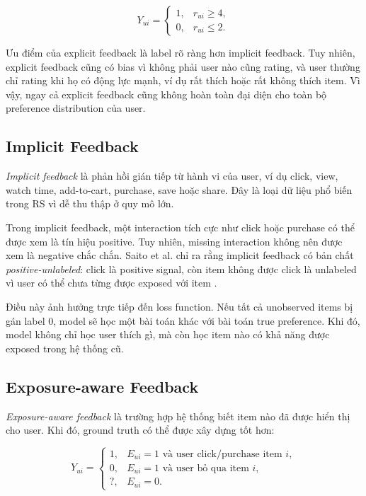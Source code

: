 \documentclass[12pt,a4paper]{article}
\begin{document}
\begin{equation}
Y_{ui} =
\begin{cases}
1, & r_{ui} \geq 4, \\
0, & r_{ui} \leq 2.
\end{cases}
\end{equation}

Ưu điểm của explicit feedback là label rõ ràng hơn implicit feedback. Tuy nhiên, explicit feedback cũng có bias vì không phải user nào cũng rating, và user thường chỉ rating khi họ có động lực mạnh, ví dụ rất thích hoặc rất không thích item. Vì vậy, ngay cả explicit feedback cũng không hoàn toàn đại diện cho toàn bộ preference distribution của user.

\subsection{Implicit Feedback}

\textit{Implicit feedback} là phản hồi gián tiếp từ hành vi của user, ví dụ click, view, watch time, add-to-cart, purchase, save hoặc share. Đây là loại dữ liệu phổ biến trong RS vì dễ thu thập ở quy mô lớn.

Trong implicit feedback, một interaction tích cực như click hoặc purchase có thể được xem là tín hiệu positive. Tuy nhiên, missing interaction không nên được xem là negative chắc chắn. Saito et al. chỉ ra rằng implicit feedback có bản chất \textit{positive-unlabeled}: click là positive signal, còn item không được click là unlabeled vì user có thể chưa từng được exposed với item \cite{saito2020unbiased}.

Điều này ảnh hưởng trực tiếp đến loss function. Nếu tất cả unobserved items bị gán label $0$, model sẽ học một bài toán khác với bài toán true preference. Khi đó, model không chỉ học user thích gì, mà còn học item nào có khả năng được exposed trong hệ thống cũ.

\subsection{Exposure-aware Feedback}

\textit{Exposure-aware feedback} là trường hợp hệ thống biết item nào đã được hiển thị cho user. Khi đó, ground truth có thể được xây dựng tốt hơn:

\begin{equation}
Y_{ui} =
\begin{cases}
1, & E_{ui}=1 \text{ và user click/purchase item } i, \\
0, & E_{ui}=1 \text{ và user bỏ qua item } i, \\
?, & E_{ui}=0.
\end{cases}
\end{equation}
\end{document}
